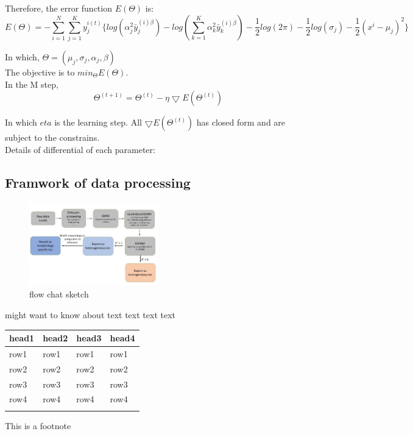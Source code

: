 \documentclass{bioinfo}
\begin{document}
Therefore, the error function $E(\Theta )$ is:
$$E(\Theta )=-\sum_{i=1}^{N}\sum_{j=1}^{K}y^{i(t)}_j\{log(\alpha_j^2\bar{y}^{(i)\beta}_j)-log(\sum_{k=1}^{K}\alpha_k^2\bar{y}^{(i)\beta}_k)-\frac{1}{2}log(2\pi)-\frac{1}{2}log(\sigma_j)-\frac{1}{2}(x^i-\mu_j)^2\}$$

In which, $\Theta =(\mu_j, \sigma_j, \alpha_j, \beta)$\\

The objective is to $min_\Theta E(\Theta)$.\\


In the M step,
$$\Theta ^{(t+1)}=\Theta ^{(t)}-\eta \bigtriangledown E(\Theta ^{(t)})$$

In which $eta$ is the learning step. All $\bigtriangledown E(\Theta ^{(t)})$ has closed form and are subject to the constrains.\\
Details of differential of each parameter:
$$$$

\subsection{Framwork of data processing}

\begin{figure}[b!]

	\includegraphics[width=0.5\textwidth]{figure3.jpg}
    \caption{flow chat sketch}
    \label{fig:figure3}
\end{figure}
\citealp{Boffelli03} might want to know about text text text
text\vspace*{1pt}

\begin{table}[!t]
 {\begin{tabular}{@{}llll@{}}\toprule head1 &
head2 & head3 & head4\\\midrule
row1 & row1 & row1 & row1\\
row2 & row2 & row2 & row2\\
row3 & row3 & row3 & row3\\
row4 & row4 & row4 & row4\\\botrule
\end{tabular}}{This is a footnote}
\end{table}
\end{document}
